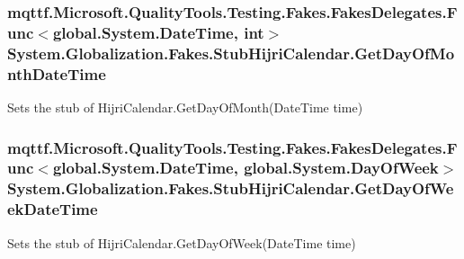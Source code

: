 \hypertarget{class_system_1_1_globalization_1_1_fakes_1_1_stub_hijri_calendar_a68e1691a8cfefd7889098463ddcd8e0c}{
\subsubsection[{Get\-Day\-Of\-Month\-Date\-Time}]{\setlength{\rightskip}{0pt plus 5cm}mqttf.\-Microsoft.\-Quality\-Tools.\-Testing.\-Fakes.\-Fakes\-Delegates.\-Func$<$global.\-System.\-Date\-Time, int$>$ System.\-Globalization.\-Fakes.\-Stub\-Hijri\-Calendar.\-Get\-Day\-Of\-Month\-Date\-Time}}\label{class_system_1_1_globalization_1_1_fakes_1_1_stub_hijri_calendar_a68e1691a8cfefd7889098463ddcd8e0c}


Sets the stub of Hijri\-Calendar.\-Get\-Day\-Of\-Month(\-Date\-Time time)

\hypertarget{class_system_1_1_globalization_1_1_fakes_1_1_stub_hijri_calendar_a60facdffc276cc53670f74f7af1f091c}{
\subsubsection[{Get\-Day\-Of\-Week\-Date\-Time}]{\setlength{\rightskip}{0pt plus 5cm}mqttf.\-Microsoft.\-Quality\-Tools.\-Testing.\-Fakes.\-Fakes\-Delegates.\-Func$<$global.\-System.\-Date\-Time, global.\-System.\-Day\-Of\-Week$>$ System.\-Globalization.\-Fakes.\-Stub\-Hijri\-Calendar.\-Get\-Day\-Of\-Week\-Date\-Time}}\label{class_system_1_1_globalization_1_1_fakes_1_1_stub_hijri_calendar_a60facdffc276cc53670f74f7af1f091c}


Sets the stub of Hijri\-Calendar.\-Get\-Day\-Of\-Week(\-Date\-Time time)

